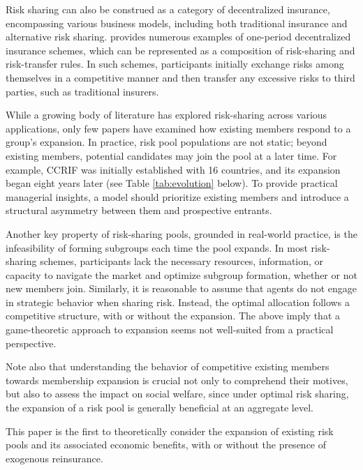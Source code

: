 \documentclass[fleqn,mnsc,nonblindrev]{informs4}
\begin{document}
Risk sharing can also be construed as a category of decentralized insurance, encompassing various business models, including both traditional insurance and alternative risk sharing. \cite{feng2024unified} provides numerous examples of one-period decentralized insurance schemes, which can be represented as a composition of risk-sharing and risk-transfer rules. In such schemes, participants initially exchange risks among themselves in a competitive manner and then transfer any excessive risks to third parties, such as traditional insurers. 


While a growing body of literature has explored risk-sharing across various applications, only few papers have examined how existing members respond to a group's expansion.  In practice, risk pool populations are not static; beyond existing members, potential candidates may join the pool at a later time. For example, CCRIF was initially established with 16 countries, and its expansion began eight years later (see Table \ref{tab:evolution} below). To provide practical managerial insights, a model should prioritize existing members and introduce a structural asymmetry between them and prospective entrants.

   {Another key property of risk-sharing pools, grounded in real-world practice, is the infeasibility of forming subgroups each time the pool expands. In most risk-sharing schemes, participants lack the necessary resources, information, or capacity to navigate the market and optimize subgroup formation, whether or not new members join. Similarly, it is reasonable to assume that agents do not engage in strategic behavior when sharing risk. Instead, the optimal allocation follows a competitive structure, with or without the expansion. The above imply that a game-theoretic approach to expansion seems not well-suited from a practical perspective.}

   {Note also that understanding the behavior of competitive existing members towards membership expansion is crucial not only to comprehend their motives, but also to assess the impact on social welfare, since under optimal risk sharing, the expansion of a risk pool is generally beneficial at an aggregate level.} 

   {This paper is the first to theoretically consider the expansion of existing risk pools and its associated economic benefits, with or without the presence of exogenous reinsurance.}
\end{document}
